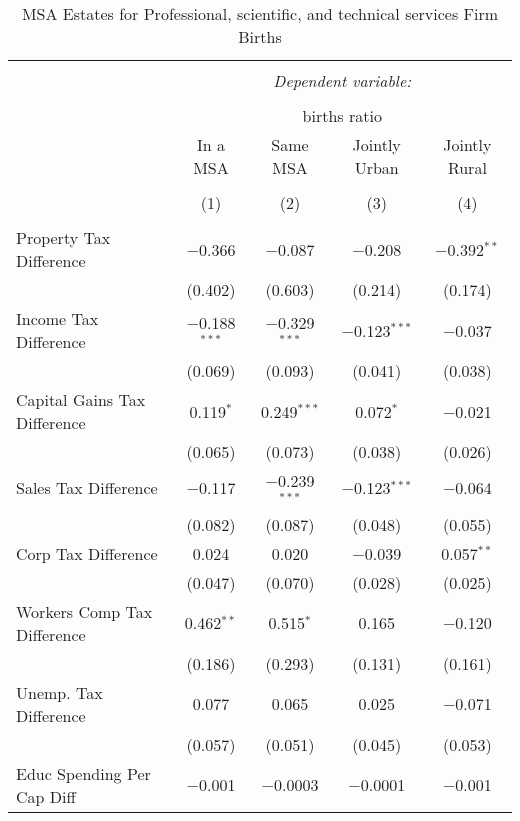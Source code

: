
\begin{table}[!htbp] \centering 
  \caption{MSA Estates for  Professional, scientific, and technical services Firm Births} 
  \label{54metro} 
\begin{tabular}{@{\extracolsep{5pt}}lcccc} 
\\[-1.8ex]\hline 
\hline \\[-1.8ex] 
 & \multicolumn{4}{c}{\textit{Dependent variable:}} \\ 
\cline{2-5} 
\\[-1.8ex] & \multicolumn{4}{c}{births ratio} \\ 
 & In a MSA & Same MSA & Jointly Urban & Jointly Rural \\ 
\\[-1.8ex] & (1) & (2) & (3) & (4)\\ 
\hline \\[-1.8ex] 
 Property Tax Difference & $-$0.366 & $-$0.087 & $-$0.208 & $-$0.392$^{**}$ \\ 
  & (0.402) & (0.603) & (0.214) & (0.174) \\ 
  Income Tax Difference & $-$0.188$^{***}$ & $-$0.329$^{***}$ & $-$0.123$^{***}$ & $-$0.037 \\ 
  & (0.069) & (0.093) & (0.041) & (0.038) \\ 
  Capital Gains Tax Difference & 0.119$^{*}$ & 0.249$^{***}$ & 0.072$^{*}$ & $-$0.021 \\ 
  & (0.065) & (0.073) & (0.038) & (0.026) \\ 
  Sales Tax Difference & $-$0.117 & $-$0.239$^{***}$ & $-$0.123$^{***}$ & $-$0.064 \\ 
  & (0.082) & (0.087) & (0.048) & (0.055) \\ 
  Corp Tax Difference & 0.024 & 0.020 & $-$0.039 & 0.057$^{**}$ \\ 
  & (0.047) & (0.070) & (0.028) & (0.025) \\ 
  Workers Comp Tax Difference & 0.462$^{**}$ & 0.515$^{*}$ & 0.165 & $-$0.120 \\ 
  & (0.186) & (0.293) & (0.131) & (0.161) \\ 
  Unemp. Tax Difference & 0.077 & 0.065 & 0.025 & $-$0.071 \\ 
  & (0.057) & (0.051) & (0.045) & (0.053) \\ 
  Educ Spending Per Cap Diff & $-$0.001 & $-$0.0003 & $-$0.0001 & $-$0.001 \\ 

\end{tabular}
\end{table}
